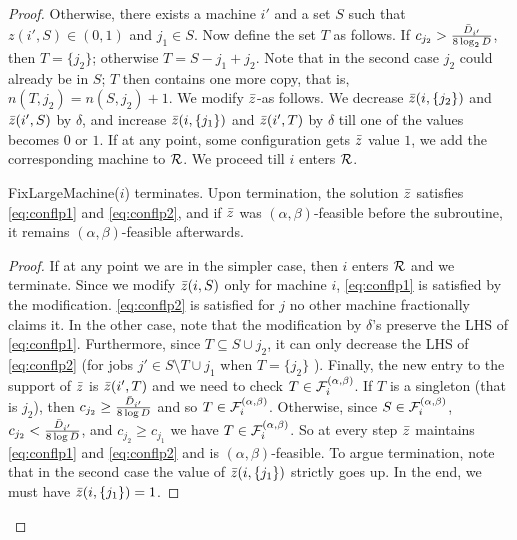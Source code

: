 \begin{proof}
Otherwise, there exists a machine $i'$ 
and a set $S$ such that $z(i',S) \in (0,1)$ and $j_1 \in S$. 
Now define the set $T$ as follows. If $c_{j_2} > \frac{\bar{D}_{i'}}{8\log_2 D}$, then $T = \{j_2\}$; otherwise $T = S - j_1 + j_2$. 
Note that in the second case $j_2$ could already be in $S$; $T$ then contains one more copy, that is, $n(T,j_2) = n(S,j_2) + 1$.
We modify $\bar z$-as follows. We decrease $\bar z(i,\{j_2\})$ and $\bar z(i',S)$ by $\delta$, and increase $\bar z(i,\{j_1\})$ and $\bar z(i',T)$ by $\delta$ till one of the values becomes $0$ or $1$. 
If at any point, some configuration gets $\bar z$ value $1$, we add the corresponding machine to ${\cal R}$.
We proceed till $i$ enters ${\cal R}$.

\begin{claim}\label{clm:002}
	{\sf FixLargeMachine}($i$) terminates. Upon termination, the solution $\bar z$ satisfies \eqref{eq:conflp1} and \eqref{eq:conflp2}, and
	if $\bar z$ was $(\alpha,\beta)$-feasible before the subroutine, it remains $(\alpha,\beta)$-feasible afterwards.
\end{claim}
\begin{proof}
	If at any point we are in the simpler case, then $i$ enters ${\cal R}$ and we terminate. Since we modify $\bar z(i,S)$ only for machine $i$, \eqref{eq:conflp1} is satisfied by the modification.
	\eqref{eq:conflp2} is satisfied for $j$ no other machine fractionally claims it. In the other case, note that the modification by $\delta$'s preserve the LHS of \eqref{eq:conflp1}. Furthermore, since $T\subseteq S\cup j_2$, it can only 
	decrease the LHS of \eqref{eq:conflp2} (for jobs $j' \in S\setminus T\cup j_1$ when $T=\{j_2\}$ ). Finally, the new entry to the support of $\bar z$ is $\bar z(i',T)$ and we need to check $T\in {\cal F}^{(\alpha,\beta)}_i$.
	If $T$ is a singleton (that is $j_2$), then $c_{j_2} \geq \frac{\bar{D}_{i'}}{8\log D}$ and so $T\in {\cal F}^{(\alpha,\beta)}_i$.
  Otherwise, since $S\in {\cal F}^{(\alpha,\beta)}_i$, $c_{j_2} <  \frac{\bar{D}_{i'}}{8\log D}$, and $c_{j_2} \geq c_{j_1}$ we have $T\in {\cal F}^{(\alpha,\beta)}_i$. 
  So at every step $\bar z$ maintains \eqref{eq:conflp1} and \eqref{eq:conflp2} and is $(\alpha,\beta)$-feasible. To argue termination, note that in the second case the value of $\bar z(i,\{j_1\})$ strictly goes up.
  In the end, we must have $\bar z(i,\{j_1\}) = 1$.
\end{proof}


\end{proof}
